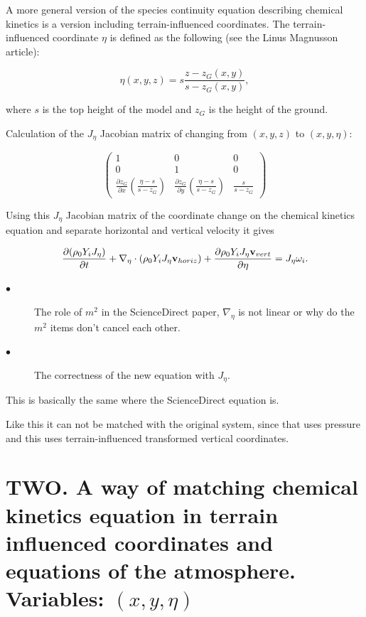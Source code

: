 \documentclass{article}
\begin{document}
A more general version of the species continuity equation describing chemical kinetics is a version including terrain-influenced coordinates.
The terrain-influenced coordinate $\eta$ is defined as the following (see the Linus Magnusson article):

\[ \eta (x,y,z) = s \frac{z-z_G (x,y)}{s - z_G(x,y)},\]

where $s$ is the top height of the model and $z_G$ is the height of the ground.

Calculation of the $J_{\eta}$ Jacobian matrix of changing from $(x, y, z) $ to $ (x, y, \eta) $:

\[ \left( \begin{array}{ccc}
1 & 0 & 0 \\
0 & 1 & 0 \\
\frac{\partial z_G}{\partial x}(\frac{\eta - s}{s - z_G}) & \frac{\partial z_G}{\partial y}(\frac{\eta - s}{s - z_G}) & \frac{s}{s-z_G} \end{array} \right)\]

Using this $J_{\eta}$ Jacobian matrix of the coordinate change on the chemical kinetics equation and separate horizontal and vertical velocity it gives

\[ \frac{\partial(\rho_0 Y_i J_{\eta})}{\partial t} + \nabla_{\eta} \cdot (\rho_0 Y_i J_{\eta} \bold{v}_{horiz}) + \frac{\partial \rho_0 Y_i J_{\eta} \bold{v}_{vert}}{\partial \eta} = J_{\eta} \omega_i. \]

\begin{description}
  \item[$\bullet$] The role of $m^2$ in the ScienceDirect paper, $\nabla_{\eta}$ is not linear or why do the $m^2$ items don't cancel each other.
  \item[$\bullet$] The correctness of the new equation with $J_{\eta}$.
\end{description}

This is basically the same where the ScienceDirect equation is.

Like this it can not be matched with the original system, since that uses pressure and this uses terrain-influenced transformed vertical coordinates. 

\section{TWO. A way of matching chemical kinetics equation in terrain influenced coordinates and equations of the atmosphere. Variables: $(x,y,\eta)$}
\end{document}
